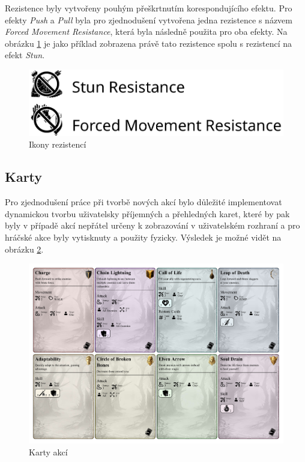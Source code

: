Rezistence byly vytvořeny pouhým přeškrtnutím korespondujícího efektu. Pro efekty \textit{Push} a \textit{Pull} byla pro zjednodušení vytvořena jedna rezistence s názvem \textit{Forced Movement Resistance}, která byla následně použita pro oba efekty. Na obrázku \ref{fig:resistances} je jako příklad zobrazena právě tato rezistence spolu s rezistencí na efekt \textit{Stun}.

\begin{figure}[H]
    \centering
    \includegraphics[scale=0.7]{figures/images/resistances.pdf}
    \caption{Ikony rezistencí}
    \label{fig:resistances}
\end{figure}

\subsection{Karty}
\label{subsec:cards}

Pro zjednodušení práce při tvorbě nových akcí bylo důležité implementovat dynamickou tvorbu uživatelsky příjemných a přehledných karet, které by pak byly v případě akcí nepřátel určeny k zobrazování v uživatelském rozhraní a pro hráčské akce byly vytisknuty a použity fyzicky. Výsledek je možné vidět na obrázku \ref{fig:cards}.

\begin{figure}[H]
    \centering
    \includegraphics[width=\textwidth]{figures/images/cards.pdf}
    \caption{Karty akcí}
    \label{fig:cards}
\end{figure}
\newpage

